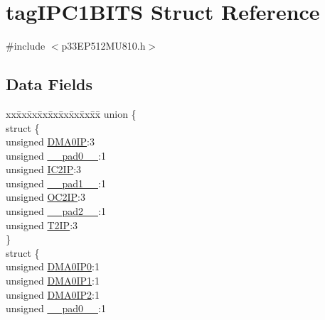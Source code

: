 \hypertarget{structtag_i_p_c1_b_i_t_s}{}\section{tag\+I\+P\+C1\+B\+I\+TS Struct Reference}
\label{structtag_i_p_c1_b_i_t_s}


{\ttfamily \#include $<$p33\+E\+P512\+M\+U810.\+h$>$}

\subsection*{Data Fields}
\begin{DoxyCompactItemize}
\item 
\begin{tabbing}
xx\=xx\=xx\=xx\=xx\=xx\=xx\=xx\=xx\=\kill
union \{\\
\>struct \{\\
\>\>unsigned \hyperlink{structtag_i_p_c1_b_i_t_s_a3c2992a7cfaf204df69d6bbeeae4cd19}{DMA0IP}:3\\
\>\>unsigned \hyperlink{structtag_i_p_c1_b_i_t_s_adf71f3d8410c1f1dbbc96680a92c49af}{\_\_pad0\_\_}:1\\
\>\>unsigned \hyperlink{structtag_i_p_c1_b_i_t_s_ae98ed15ebdaaaef6b7c5fbd49c9967a2}{IC2IP}:3\\
\>\>unsigned \hyperlink{structtag_i_p_c1_b_i_t_s_acaf2d0924a107ec6e8d2e31febaf66f9}{\_\_pad1\_\_}:1\\
\>\>unsigned \hyperlink{structtag_i_p_c1_b_i_t_s_a9aa69eea54cf5e29824c33098460e426}{OC2IP}:3\\
\>\>unsigned \hyperlink{structtag_i_p_c1_b_i_t_s_a4d97cc5f7d51d22fc2bf3eab35c9cb7f}{\_\_pad2\_\_}:1\\
\>\>unsigned \hyperlink{structtag_i_p_c1_b_i_t_s_ac061f06811bae3bddeceaaa604e6543b}{T2IP}:3\\
\>\} \\
\>struct \{\\
\>\>unsigned \hyperlink{structtag_i_p_c1_b_i_t_s_aebfc7421690e43d8e0bea74c49721bd6}{DMA0IP0}:1\\
\>\>unsigned \hyperlink{structtag_i_p_c1_b_i_t_s_a3bc6b0956739d53f6afa4b5a5e5a6cef}{DMA0IP1}:1\\
\>\>unsigned \hyperlink{structtag_i_p_c1_b_i_t_s_a0edc3ad7ff2c795e030e83439d695b1c}{DMA0IP2}:1\\
\>\>unsigned \hyperlink{structtag_i_p_c1_b_i_t_s_adf71f3d8410c1f1dbbc96680a92c49af}{\_\_pad0\_\_}:1\\

\end{tabbing}
\end{DoxyCompactItemize}
